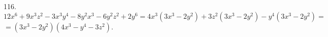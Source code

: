 116. $12x^6+9x^3z^2-3x^3y^4-8y^2x^3-6y^2z^2+2y^6=4x^3(3x^3-2y^2)+3z^2(3x^3-2y^2)-y^4(3x^3-2y^2)=$\\$=(3x^3-2y^2)(4x^3-y^4-3z^2).$\\
